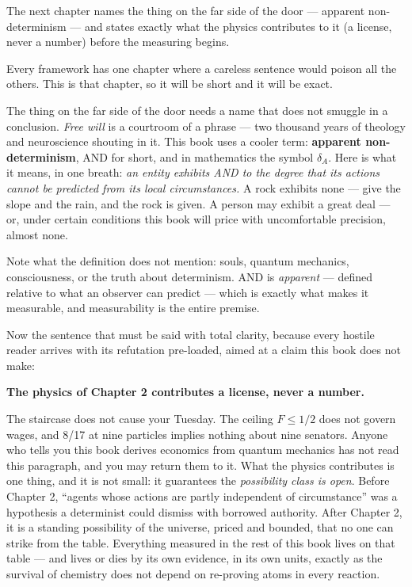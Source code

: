 The next chapter names the thing on the far side of the door --- apparent
non-determinism --- and states exactly
what the physics contributes to it (a license, never a number) before
the measuring begins.


Every framework has one chapter where a careless sentence would poison
all the others. This is that chapter, so it will be short and it will be
exact.

The thing on the far side of the door needs a name that does not smuggle
in a conclusion. \emph{Free will} is a courtroom of a phrase --- two thousand
years of theology and neuroscience shouting in it. This book uses a cooler term:
\textbf{apparent non-determinism}, AND for short, and in mathematics the
symbol \(\delta_A\). Here is what it means, in one breath: \emph{an entity exhibits
AND to the degree that its actions cannot be predicted from its local
circumstances.} A rock exhibits none --- give the slope and the rain,
and the rock is given. A person may exhibit a great deal --- or,
under certain conditions this book will price with uncomfortable
precision, almost none.

Note what the definition does not mention: souls, quantum mechanics,
consciousness, or the truth about determinism. AND is \emph{apparent} ---
defined relative to what an observer can predict --- which is exactly what
makes it measurable, and measurability is the entire premise.

Now the sentence that must be said with total clarity, because every
hostile reader arrives with its refutation pre-loaded, aimed at a claim
this book does not make:

\textbf{The physics of Chapter 2 contributes a license, never a number.}

The staircase does not cause your Tuesday. The ceiling \(F \le 1/2\) does not
govern wages, and 8/17 at nine particles implies nothing about nine
senators. Anyone who tells you this book derives economics from quantum
mechanics has not read this paragraph, and you may return them to it.
What the physics contributes is one thing, and it is not small: it
guarantees the \emph{possibility class is open}. Before Chapter 2, ``agents
whose actions are partly independent of circumstance'' was a hypothesis a
determinist could dismiss with borrowed authority. After Chapter 2, it
is a standing possibility of the universe, priced and bounded, that no
one can strike from the table. Everything measured in the rest of this
book lives on that table --- and lives or dies by its own evidence, in its
own units, exactly as the survival of chemistry does not depend on
re-proving atoms in every reaction.

